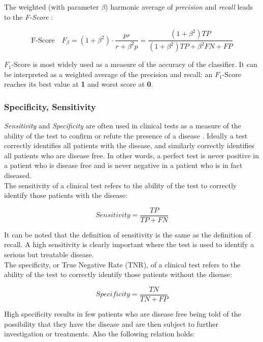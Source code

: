 The weighted (with parameter $\beta$) harmonic average of \textit{precision} and \textit{recall} leads to the \textit{F-Score} \cite{InfoRetrieval}:

\begin{equation}
 \textrm{F-Score} \quad F_{\beta} =  (1+\beta^{2}) \cdot \frac{pr}{r + \beta^{2}p} = \frac{(1+\beta^{2})TP}{(1+\beta^{2})TP + \beta^{2}FN + FP}
\end{equation}

$F_1$-Score is most widely used as a measure of the accuracy of the classifier.
It can be interpreted as a weighted average of the precision and recall: an $F_1$-Score reaches its best value at \textbf{1} and worst score at \textbf{0}.

\vspace{0.5cm}

\subsubsection{Specificity, Sensitivity}

\textit{Sensitivity} and \textit{Specificity} are often used in clinical tests as a measure of the ability of the test to confirm or 
refute the presence of a disease \cite{sensSpec}.
Ideally a test correctly identifies all patients with the disease, and similarly correctly identifies all patients who are
disease free. In other words, a perfect test is never positive in a patient who is disease free and is never negative in a patient who is in fact diseased.\\
The sensitivity of a clinical test refers to the ability of the test to correctly identify those patients with the disease:

\begin{equation}
 Sensitivity = \frac{TP}{TP + FN}
\end{equation}

It can be noted that the definition of sensitivity is the same as the definition of recall.
A high sensitivity is clearly important where the test is used to identify a serious but treatable disease.\\
The specificity, or True Negative Rate (TNR), of a clinical test refers to the ability of the test to correctly identify those patients without the disease:

\begin{equation}
 Specificity = \frac{TN}{TN + FP}
\end{equation}

High specificity results in few patients who are disease free being told of the possibility that they have the disease and are
then subject to further investigation or treatments. Also the following relation holds:

